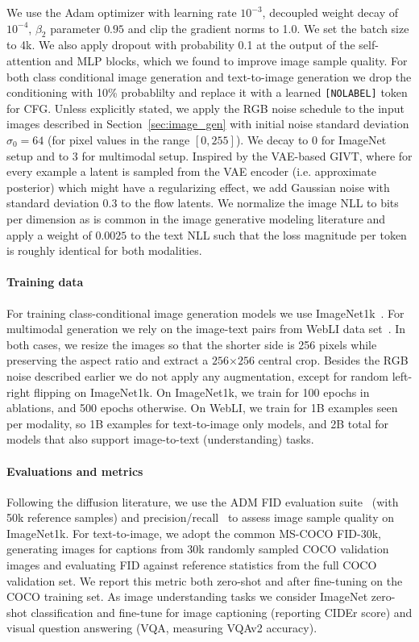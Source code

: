 \documentclass{article} %
\begin{document}
We use the Adam optimizer with learning rate $10^{-3}$, decoupled weight decay of $10^{-4}$, $\beta_2$ parameter $0.95$ and clip the gradient norms to 1.0. We set the batch size to 4k. We also apply dropout with probability 0.1 at the output of the self-attention and MLP blocks, which we found to improve image sample quality. For both class conditional image generation and text-to-image generation we drop the conditioning with 10\% probablilty and replace it with a learned \texttt{[NOLABEL]} token for CFG. Unless explicitly stated, we apply the RGB noise schedule to the input images described in Section~\ref{sec:image_gen} with initial noise standard deviation $\sigma_0 = 64$ (for pixel values in the range $[0, 255]$). We decay to $0$ for ImageNet setup and to $3$ for multimodal setup. Inspired by the VAE-based GIVT, where for every example a latent is sampled from the VAE encoder (i.e. approximate posterior) which might have a regularizing effect, we add Gaussian noise with standard deviation 0.3 to the flow latents. We normalize the image NLL to bits per dimension as is common in the image generative modeling literature and apply a weight of $0.0025$ to the text NLL such that the loss magnitude per token is roughly identical for both modalities.

\paragraph{Training data} For training class-conditional image generation models we use ImageNet1k~\citep{russakovsky2015imagenet}. For multimodal generation we rely on the image-text pairs from WebLI data set~\citep{chen2022pali}. In both cases, we resize the images so that the shorter side is 256 pixels while preserving the aspect ratio and extract a $256$$\times$$256$ central crop. Besides the RGB noise described earlier we do not apply any augmentation, except for random left-right flipping on ImageNet1k. On ImageNet1k, we train for 100 epochs in ablations, and 500 epochs otherwise. On WebLI, we train for 1B examples seen per modality, so 1B examples for text-to-image only models, and 2B total for models that also support image-to-text (understanding) tasks.

\paragraph{Evaluations and metrics} Following the diffusion literature, we use the ADM FID evaluation suite~\citep{dhariwal2021diffusion} (with 50k reference samples) and precision/recall~\citep{sajjadi2018assessing} to assess image sample quality on ImageNet1k. For text-to-image, we adopt the common MS-COCO FID-30k, generating images for captions from 30k randomly sampled COCO validation images and evaluating FID against reference statistics from the full COCO validation set. We report this metric both zero-shot and after fine-tuning on the COCO training set. As image understanding tasks we consider ImageNet zero-shot classification and fine-tune for image captioning (reporting CIDEr score) and visual question answering (VQA, measuring VQAv2 accuracy).
\end{document}
